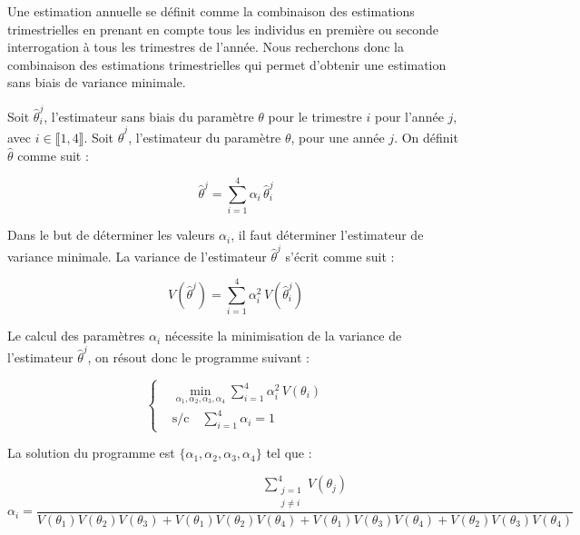 \documentclass[12pt, a4paper]{article}
\begin{document}
Une estimation annuelle se définit comme la combinaison des estimations trimestrielles en prenant en compte tous les individus en première ou seconde interrogation à tous les trimestres de l'année. Nous recherchons donc la combinaison des estimations trimestrielles qui permet d'obtenir une estimation sans biais de variance minimale.

Soit $\widehat{\theta}_{i}^{j}$, l'estimateur sans biais du paramètre $\theta$ pour le trimestre $i$ pour l'année $j$, avec $i \in \llbracket 1,4 \rrbracket$. Soit $\widehat{\theta}^{j}$, l'estimateur du paramètre $\theta$, pour une année $j$. On définit $\widehat{\theta}$ comme suit :

\begin{equation}
  \widehat{\theta}^{j} = \sum_{i=1}^{4} \alpha_{i}\, \widehat{\theta}_{i}^{j}
\end{equation}

Dans le but de déterminer les valeurs $\alpha_{i}$, il faut déterminer l'estimateur de variance minimale. La variance de l'estimateur $\widehat{\theta}^{j}$ s'écrit comme suit :

\begin{equation}
  V\!\left(\widehat{\theta}^{j}\right) = \sum_{i=1}^{4} \alpha_{i}^{2}\, V\!\left(\widehat{\theta}_{i}^{j}\right)
\end{equation}

Le calcul des paramètres $\alpha_{i}$ nécessite la minimisation de la variance de l'estimateur $\widehat{\theta}^{j}$, on résout donc le programme suivant :

\begin{equation}
  \left\{
  \begin{aligned}
    &\min_{\alpha_1,\alpha_2,\alpha_3,\alpha_4} \sum_{i=1}^{4} \alpha_{i}^{2}\, V(\theta_{i}) \\
    &\text{s/c} \quad \sum_{i=1}^{4} \alpha_{i} = 1
  \end{aligned}
  \right.
\end{equation}

La solution du programme est $\{\alpha_1,\alpha_2,\alpha_3,\alpha_4\}$ tel que :

\begin{equation}
  \alpha_{i} = \frac{\displaystyle\sum_{\substack{j=1 \\ j \neq i}}^{4} V(\theta_{j})}
  {V(\theta_1)V(\theta_2)V(\theta_3) + V(\theta_1)V(\theta_2)V(\theta_4) + V(\theta_1)V(\theta_3)V(\theta_4) + V(\theta_2)V(\theta_3)V(\theta_4)}
\end{equation}
\end{document}

